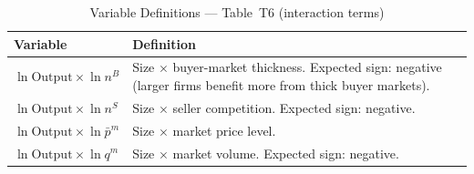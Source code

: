 \documentclass[12pt]{article}
\begin{document}
\begin{table}[H]
  \centering
  \caption{Variable Definitions --- Table~T6 (interaction terms)}
  \label{tab:vardef_t6}
  \begin{tabular}{L{3.5cm} L{10.5cm}}
    \toprule
    Variable & Definition \\
    \midrule
    \(\ln\text{Output} \times \ln n^{B}\) &
      Size \(\times\) buyer-market thickness. Expected sign: negative
      (larger firms benefit more from thick buyer markets). \\[4pt]
    \(\ln\text{Output} \times \ln n^{S}\) &
      Size \(\times\) seller competition. Expected sign: negative. \\[4pt]
    \(\ln\text{Output} \times \ln\bar{p}^{m}\) &
      Size \(\times\) market price level. \\[4pt]
    \(\ln\text{Output} \times \ln q^{m}\) &
      Size \(\times\) market volume. Expected sign: negative. \\
    \bottomrule
  \end{tabular}
\end{table}
\end{document}
